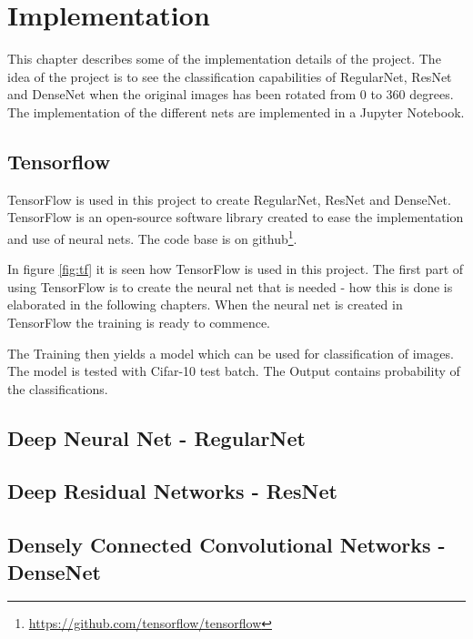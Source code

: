 \chapter{Implementation}
\label{chp:impl}

This chapter describes some of the implementation details of the project. The idea of the project is to see the classification capabilities of RegularNet, ResNet and DenseNet when the original images has been rotated from 0 to 360 degrees. The implementation of the different nets are implemented in a Jupyter Notebook.

\section{Tensorflow}
TensorFlow is used in this project to create RegularNet, ResNet and DenseNet. 
TensorFlow is an open-source software library created to ease the implementation and use of neural nets. The code base is on github\footnote{\url{https://github.com/tensorflow/tensorflow}}.

In figure \ref{fig:tf} it is seen how TensorFlow is used in this project. The first part of using TensorFlow is to create the neural net that is needed - how this is done is elaborated in the following chapters. When the neural net is created in TensorFlow the training is ready to commence. 

The Training then yields a model which can be used for classification of images. The model is tested with Cifar-10 test batch. The Output contains probability of the classifications.


\section{Deep Neural Net - RegularNet}
\section{Deep Residual Networks - ResNet}
\section{Densely Connected Convolutional Networks - DenseNet}